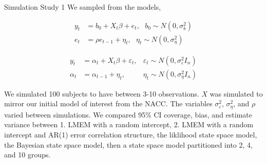 \documentclass[
  ignorenonframetext,
]{beamer}
\begin{document}
\begin{frame}{Simulation Study 1}
\protect\hypertarget{simulation-study-1}{}
We sampled from the models,

\begin{equation}
\begin{aligned}
y_t &= b_0 + X_t \beta + e_t, \ \ \ b_0\sim N(0, \sigma^2_b)\\
e_t &= \rho e_{t-1} + \eta_t, \ \ \ \eta_t \sim N(0, \sigma^2_\eta) 
\end{aligned}
\end{equation}

\begin{equation}
\begin{aligned}
y_t &= \alpha_t + X_t\beta + \varepsilon_t, & \varepsilon_t \sim N(0,\sigma_\varepsilon^2I_n)\\
\alpha_t &= \alpha_{t-1} +\eta_t, & \eta_t \sim N(0,\sigma_\eta^2I_n)
\end{aligned}
\end{equation}

We simulated 100 subjects to have between 3-10 observations. \(X\) was
simulated to mirror our initial model of interest from the NACC. The
variables \(\sigma^2_\varepsilon\), \(\sigma^2_\eta\), and \(\rho\)
varied between simulations. We compared 95\% CI coverage, bias, and
estimate variance between 1. LMEM with a random intercept, 2. LMEM with
a random intercept and AR(1) error correlation structure, the liklihood
state space model, the Bayesian state space model, then a state space
model partitioned into 2, 4, and 10 groups.
\end{frame}
\end{document}
